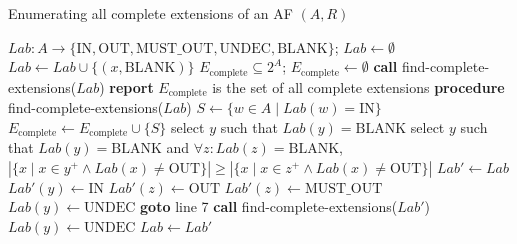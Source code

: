\documentclass{rapportECL}
\begin{document}
\begin{itemize}
\begin{algorithm}
    \caption{Enumerating all complete extensions of an AF $(A, R)$}
    \begin{algorithmic}[1]
        \STATE $Lab : A \to \{\text{IN}, \text{OUT}, \text{MUST\_OUT}, \text{UNDEC}, \text{BLANK}\}$; $Lab \gets \emptyset$
            \STATE $Lab \gets Lab \cup \{(x, \text{BLANK})\}$
        \ENDFOR
        \STATE $E_{\text{complete}} \subseteq 2^A$; $E_{\text{complete}} \gets \emptyset$
        \STATE \textbf{call} find-complete-extensions($Lab$)
        \STATE \textbf{report} $E_{\text{complete}}$ is the set of all complete extensions
        \STATE \textbf{procedure} find-complete-extensions($Lab$)
            \RETURN
        \ENDIF
            \STATE $S \gets \{w \in A \mid Lab(w) = \text{IN}\}$
            \STATE $E_{\text{complete}} \gets E_{\text{complete}} \cup \{S\}$
        \ENDIF
                \STATE select $y$ such that $Lab(y) = \text{BLANK}$
            \ELSE
                \STATE select $y$ such that $Lab(y) = \text{BLANK}$ and $\forall z : Lab(z) = \text{BLANK}$,
                \STATE $\left| \{x \mid x \in {y}^+ \land Lab(x) \neq \text{OUT} \} \right| \geq \left| \{x \mid x \in {z}^+ \land Lab(x) \neq \text{OUT} \} \right|$
            \ENDIF
            \STATE $Lab' \gets Lab$
            \STATE $Lab'(y) \gets \text{IN}$
                \STATE $Lab'(z) \gets \text{OUT}$
            \ENDFOR
                    \STATE $Lab'(z) \gets \text{MUST\_OUT}$
                \ENDIF
                    \STATE $Lab(y) \gets \text{UNDEC}$
                \ENDIF
            \ENDFOR
            \STATE \textbf{goto} line 7
            \STATE \textbf{call} find-complete-extensions($Lab'$)
                \STATE $Lab(y) \gets \text{UNDEC}$
            \ELSE
                \STATE $Lab \gets Lab'$
            \ENDIF
        \ENDWHILE
    \end{algorithmic}
\end{algorithm}


\end{itemize}
\end{document}
